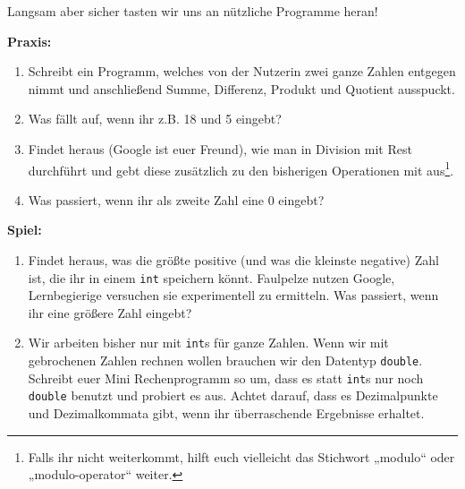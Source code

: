 
Langsam aber sicher tasten wir uns an nützliche Programme heran!

\textbf{Praxis:}
\begin{enumerate}[resume]
    \item Schreibt ein Programm, welches von der Nutzerin zwei ganze Zahlen
        entgegen nimmt und anschließend Summe, Differenz, Produkt und Quotient
        ausspuckt.
    \item Was fällt auf, wenn ihr z.B. 18 und 5 eingebt?
	\item Findet heraus (Google ist euer Freund), wie man in \Cpp Division mit
		Rest durchführt und gebt diese zusätzlich zu den bisherigen Operationen
		mit aus\footnote{Falls ihr nicht weiterkommt, hilft euch vielleicht das
		Stichwort „modulo“ oder „modulo-operator“ weiter.}.
    \item Was passiert, wenn ihr als zweite Zahl eine 0 eingebt?
\end{enumerate}

\textbf{Spiel:}
\begin{enumerate}
    \item Findet heraus, was die größte positive (und was die kleinste
        negative) Zahl ist, die ihr in einem \texttt{int} speichern könnt.
        Faulpelze nutzen Google, Lernbegierige versuchen sie experimentell zu
        ermitteln. Was passiert, wenn ihr eine größere Zahl eingebt?
    \item Wir arbeiten bisher nur mit \texttt{int}s für ganze Zahlen. Wenn wir
        mit gebrochenen Zahlen rechnen wollen brauchen wir den Datentyp
        \texttt{double}. Schreibt euer Mini Rechenprogramm so um, dass es statt
        \texttt{int}s nur noch \texttt{double} benutzt und probiert es aus.
        Achtet darauf, dass es Dezimalpunkte und Dezimalkommata gibt, wenn ihr
        überraschende Ergebnisse erhaltet.
\end{enumerate}
